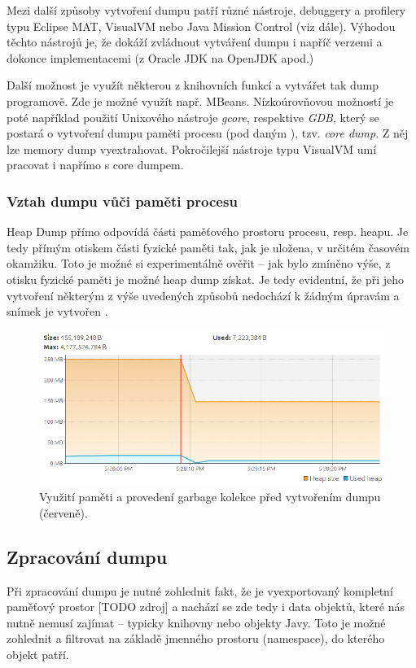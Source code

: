 Mezi další způsoby vytvoření dumpu patří různé nástroje, debuggery a profilery typu Eclipse MAT, VisualVM nebo Java Mission Control (viz dále). Výhodou těchto nástrojů je, že dokáží zvládnout vytváření dumpu i napříč verzemi a dokonce implementacemi (z Oracle JDK na OpenJDK apod.)

Další možnost je využít některou z knihovních funkcí a vytvářet tak dump programově. Zde je možné využít např. MBeans. Nízkoúrovňovou možností je poté například použití Unixového nástroje \textit{gcore}, respektive \textit{GDB}, který se postará o vytvoření dumpu paměti procesu (pod daným ), tzv. \textit{core dump}. Z něj lze memory dump vyextrahovat. Pokročilejší nástroje typu VisualVM umí pracovat i napřímo s core dumpem.

\subsubsection{Vztah dumpu vůči paměti procesu}
Heap Dump přímo odpovídá části paměťového prostoru procesu, resp. heapu. Je tedy přímým otiskem části fyzické paměti tak, jak je uložena, v určitém časovém okamžiku. Toto je možné si experimentálně ověřit -- jak bylo zmíněno výše, z otisku fyzické paměti je možné heap dump získat. Je tedy evidentní, že při jeho vytvoření některým z výše uvedených způsobů nedochází k žádným úpravám a snímek je vytvořen . 

\begin{figure}[h]
	\centering
	\includegraphics[scale=0.5]{obrazky/heapdump-performed.png}
	\caption{Využití paměti a provedení garbage kolekce před vytvořením dumpu (červeně).}
	\label{obr1}
\end{figure}

\subsection{Zpracování dumpu}
Při zpracování dumpu je nutné zohlednit fakt, že je vyexportovaný kompletní paměťový prostor [TODO zdroj] a nachází se zde tedy i data objektů, které nás nutně nemusí zajímat – typicky knihovny nebo objekty Javy. Toto je možné zohlednit a filtrovat na základě jmenného prostoru (namespace), do kterého objekt patří.


